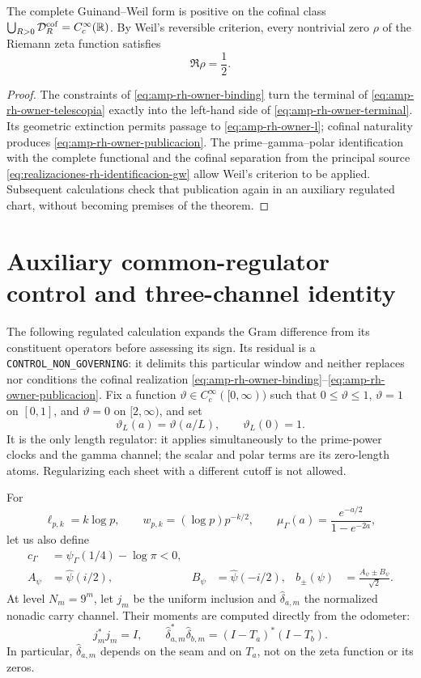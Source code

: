 \begin{theorem}
\label{thm:amp-rh-cierre-cofinal-propietario}
The complete Guinand--Weil form is positive on the cofinal class \(\bigcup_{R>0}\mathcal D_R^{\rm cof}=C_c^\infty(\mathbb R)\). By Weil's reversible criterion, every nontrivial zero \(\rho\) of the Riemann zeta function satisfies
\[
 \Re\rho=\frac12.
\]
\end{theorem}

\begin{proof}
The constraints of \eqref{eq:amp-rh-owner-binding} turn the terminal of \eqref{eq:amp-rh-owner-telescopia} exactly into the left-hand side of \eqref{eq:amp-rh-owner-terminal}. Its geometric extinction permits passage to \eqref{eq:amp-rh-owner-l}; cofinal naturality produces \eqref{eq:amp-rh-owner-publicacion}. The prime--gamma--polar identification with the complete functional and the cofinal separation from the principal source \eqref{eq:realizaciones-rh-identificacion-gw} allow Weil's criterion to be applied. Subsequent calculations check that publication again in an auxiliary regulated chart, without becoming premises of the theorem.
\end{proof}

\section*{Auxiliary common-regulator control and three-channel identity}

The following regulated calculation expands the Gram difference from its constituent operators before assessing its sign. Its residual is a \texttt{CONTROL\_NON\_GOVERNING}: it delimits this particular window and neither replaces nor conditions the cofinal realization \eqref{eq:amp-rh-owner-binding}--\eqref{eq:amp-rh-owner-publicacion}. Fix a function \(\vartheta\in C_c^\infty([0,\infty))\) such that \(0\leq\vartheta\leq1\), \(\vartheta=1\) on \([0,1]\), and \(\vartheta=0\) on \([2,\infty)\), and set
\[
 \vartheta_L(a)=\vartheta(a/L),\qquad \vartheta_L(0)=1 .
\]
It is the only length regulator: it applies simultaneously to the prime-power clocks and the gamma channel; the scalar and polar terms are its zero-length atoms. Regularizing each sheet with a different cutoff is not allowed.

For
\[
 \ell_{p,k}=k\log p,\qquad
 w_{p,k}=(\log p)p^{-k/2},\qquad
 \mu_\Gamma(a)=\frac{e^{-a/2}}{1-e^{-2a}},
\]
let us also define
\begin{align*}
 c_\Gamma&=\psi_\Gamma(1/4)-\log\pi<0,\\
 A_\psi&=\widehat\psi(i/2),&
 B_\psi&=\widehat\psi(-i/2),&
 b_\pm(\psi)&=\frac{A_\psi\pm B_\psi}{\sqrt2}.
\end{align*}
At level \(N_m=9^m\), let \(j_m\) be the uniform inclusion and \(\widehat\delta_{a,m}\) the normalized nonadic carry channel. Their moments are computed directly from the odometer:
\begin{equation}\label{eq:amp-rh-momentos-odometro-explicitos}
 j_m^*j_m=I,\qquad
 \widehat\delta_{a,m}^*\widehat\delta_{b,m}
 =(I-T_a)^*(I-T_b).
\end{equation}
In particular, \(\widehat\delta_{a,m}\) depends on the seam and on \(T_a\), not on the zeta function or its zeros.

